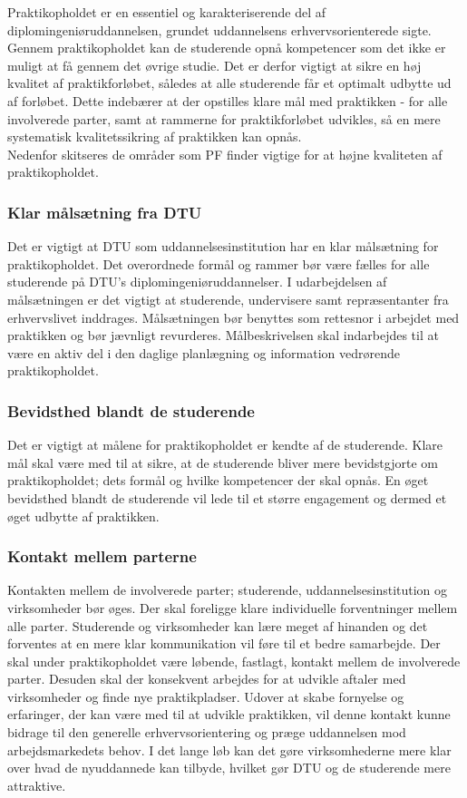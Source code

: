 Praktikopholdet er en essentiel og karakteriserende del af diplomingeniøruddannelsen, grundet uddannelsens erhvervsorienterede sigte. Gennem praktikopholdet kan de studerende opnå kompetencer som det ikke er muligt at få gennem det øvrige studie. Det er derfor vigtigt at sikre en høj kvalitet af praktikforløbet, således at alle studerende får et optimalt udbytte ud af forløbet. Dette indebærer at der opstilles klare mål med praktikken - for alle involverede parter, samt at rammerne for praktikforløbet udvikles, så en mere systematisk kvalitetssikring af praktikken kan opnås.\\

Nedenfor skitseres de områder som PF finder vigtige for at højne kvaliteten af praktikopholdet.

\subsubsection{Klar målsætning fra DTU}
Det er vigtigt at DTU som uddannelsesinstitution har en klar målsætning for praktikopholdet. Det overordnede formål og rammer bør være fælles for alle studerende på DTU’s diplomingeniøruddannelser. I udarbejdelsen af målsætningen er det vigtigt at studerende, undervisere samt repræsentanter fra erhvervslivet inddrages. Målsætningen bør benyttes som rettesnor i arbejdet med praktikken og bør jævnligt revurderes. Målbeskrivelsen skal indarbejdes til at være en aktiv del i den daglige planlægning og information vedrørende praktikopholdet.

\subsubsection{Bevidsthed blandt de studerende}
Det er vigtigt at målene for praktikopholdet er kendte af de studerende. Klare mål skal være med til at sikre, at de studerende bliver mere bevidstgjorte om praktikopholdet; dets formål og hvilke kompetencer der skal opnås. En øget bevidsthed blandt de studerende vil lede til et større engagement og dermed et øget udbytte af praktikken.

\subsubsection{Kontakt mellem parterne}
Kontakten mellem de involverede parter; studerende, uddannelsesinstitution og virksomheder bør øges. Der skal foreligge klare individuelle forventninger mellem alle parter. Studerende og virksomheder kan lære meget af hinanden og det forventes at en mere klar kommunikation vil føre til et bedre samarbejde. Der skal under praktikopholdet være løbende, fastlagt, kontakt mellem de involverede parter. Desuden skal der konsekvent arbejdes for at udvikle aftaler med virksomheder og finde nye praktikpladser. Udover at skabe fornyelse og erfaringer, der kan være med til at udvikle praktikken, vil denne kontakt kunne bidrage til den generelle erhvervsorientering og præge uddannelsen mod arbejdsmarkedets behov. I det lange løb kan det gøre virksomhederne mere klar over hvad de nyuddannede kan tilbyde, hvilket gør DTU og de studerende mere attraktive.

